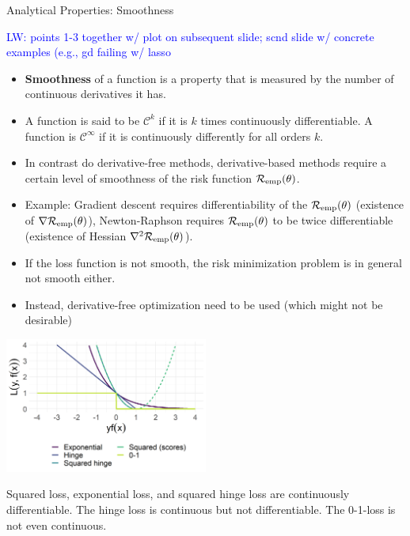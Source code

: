 \begin{vbframe}{Analytical Properties: Smoothness}

\textcolor{blue}{LW: points 1-3 together w/ plot on subsequent slide; scnd slide w/ concrete examples (e.g., gd failing w/ lasso}

\begin{itemize}
    \item \textbf{Smoothness} of a function is a property that is measured by the number of continuous derivatives it has. 
    \item A function is said to be $\mathcal{C}^k$ if it is $k$ times continuously differentiable. A function is $\mathcal{C}^\infty$ if it is continuously differently for all orders $k$. 
    \item In contrast do derivative-free methods, derivative-based methods require a certain level of smoothness of the risk function $\mathcal{R}_{\text{emp}}(\theta)$. 
    \item Example: Gradient descent requires differentiability of the $\mathcal{R}_{\text{emp}}(\theta)$ (existence of $\nabla \mathcal{R}_{\text{emp}}(\theta)$), Newton-Raphson requires $\mathcal{R}_{\text{emp}}(\theta)$ to be twice differentiable (existence of Hessian $\nabla^2 \mathcal{R}_{\text{emp}}(\theta)$). 

    \framebreak 

    \item If the loss function is not smooth, the risk minimization problem is in general not smooth either. 
    \item  Instead, derivative-free optimization need to be used (which might not be desirable)
\end{itemize}

\begin{center}
  \includegraphics[width = 0.5\textwidth]{figure/plot_loss_overview_classif.png} \\
  \begin{footnotesize}
    Squared loss, exponential loss, and squared hinge loss are continuously differentiable. The hinge loss is continuous but not differentiable. The 0-1-loss is not even continuous.   
  \end{footnotesize}
\end{center}



\end{vbframe}


